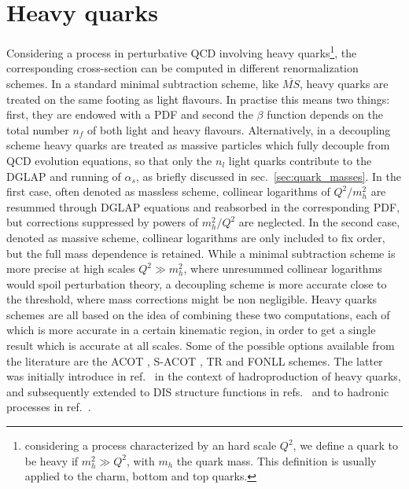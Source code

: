 \section{Heavy quarks}
\label{sec:fonll}
Considering a process in perturbative QCD involving heavy quarks\footnote{considering a process 
characterized by an hard scale $Q^2$,
we define a quark to be heavy if $m_h^2\gg Q^2$, with $m_h$ the quark mass. 
This definition is usually applied to the charm, bottom and top quarks.}, the corresponding cross-section
can be computed  in different renormalization schemes. In a standard minimal subtraction scheme, like $\overline{MS}$,
heavy quarks are treated on the same footing
as light flavours. 
In practise this means two things: first, they are endowed with a PDF and second 
the $\beta$ function depends on the total number $n_f$ of both light and heavy flavours. 
Alternatively, in a decoupling scheme heavy quarks are treated as massive particles 
which fully decouple from QCD evolution equations, 
so that only the $n_l$ light quarks contribute to the DGLAP and running of $\alpha_s$,
as briefly discussed in sec.~\ref{sec:quark_masses}.
In the first case, often denoted as massless scheme, collinear logarithms of $Q^2/m_h^2$
are resummed through DGLAP equations and reabsorbed in the corresponding PDF, but corrections
suppressed by powers of $m_h^2/Q^2$ are neglected.
In the second case, denoted as massive scheme, collinear logarithms are only included to fix order, but the 
full mass dependence is retained.
While a minimal subtraction scheme is more precise at high scales $Q^2 \gg m_h^2$, where unresummed collinear logarithms
would spoil perturbation theory, a decoupling scheme is more accurate close to the threshold, where mass
corrections might be non negligible.
Heavy quarks schemes are all based on the idea of combining these two computations, each of which is more accurate 
in a certain kinematic region, in order to get a single result which is accurate at all scales.
Some of the possible options available from the literature are 
the ACOT \cite{Aivazis:1993pi, Aivazis:1993kh, Tung:2001mv}, S-ACOT \cite{Kramer:2000hn}, TR \cite{Thorne:1997ga}
and FONLL schemes.
The latter was initially introduce in ref.~\cite{Cacciari:1998it} in the context of hadroproduction of heavy quarks, and subsequently 
extended to DIS structure functions in refs.~\cite{Forte:2010ta} and to hadronic processes in ref.~\cite{Forte:2015hba}.

